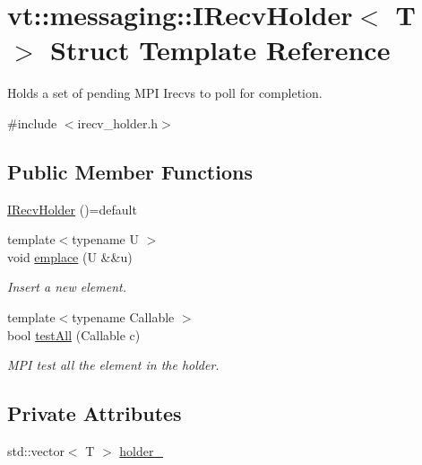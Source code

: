 \hypertarget{structvt_1_1messaging_1_1_i_recv_holder}{}\section{vt\+:\+:messaging\+:\+:I\+Recv\+Holder$<$ T $>$ Struct Template Reference}
\label{structvt_1_1messaging_1_1_i_recv_holder}


Holds a set of pending M\+PI Irecvs to poll for completion.  




{\ttfamily \#include $<$irecv\+\_\+holder.\+h$>$}

\subsection*{Public Member Functions}
\begin{DoxyCompactItemize}
\item 
\hyperlink{structvt_1_1messaging_1_1_i_recv_holder_a709a349d723247b10bf57ca2831bfe19}{I\+Recv\+Holder} ()=default
\item 
{\footnotesize template$<$typename U $>$ }\\void \hyperlink{structvt_1_1messaging_1_1_i_recv_holder_ab81d251a84cb2c8366eb5f5052ce002c}{emplace} (U \&\&u)
\begin{DoxyCompactList}\small\item\em Insert a new element. \end{DoxyCompactList}\item 
{\footnotesize template$<$typename Callable $>$ }\\bool \hyperlink{structvt_1_1messaging_1_1_i_recv_holder_a5c25ae9371ef928b00c42405d9d00a38}{test\+All} (Callable c)
\begin{DoxyCompactList}\small\item\em M\+PI test all the element in the holder. \end{DoxyCompactList}\end{DoxyCompactItemize}
\subsection*{Private Attributes}
\begin{DoxyCompactItemize}
\item 
std\+::vector$<$ T $>$ \hyperlink{structvt_1_1messaging_1_1_i_recv_holder_ad906203e102f9180b56d66393bd47c55}{holder\+\_\+}
\end{DoxyCompactItemize}


